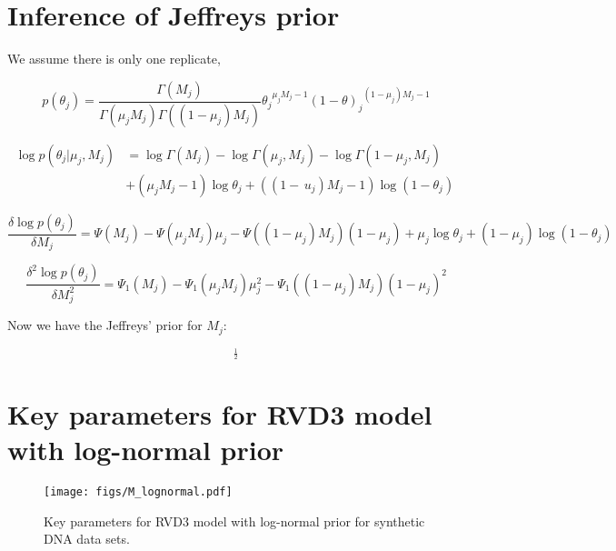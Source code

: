 \documentclass[11pt,reqno]{amsart}
\begin{document}
\section{Inference of Jeffreys prior}\label{sec:appendix_mom}
We assume there is only one replicate,

\begin{equation}\label{eqn:Betapdf}
p\left({\theta }_{j} \right)= \frac{\Gamma \left({M}_{j} \right)}{\Gamma \left({\mu }_{j} {M}_{j}\right)\Gamma \left(( 1-{\mu }_{j}){M}_{j}\right)} {{\theta}_{j}}^{{\mu}_{j}{M}_{j}-1}{\left(1-\theta\right)_{j}}^{\left(1-{\mu}_{j}\right){M}_{j}-1}
\end{equation}

\begin{equation}\label{equ:JefferyInference1}
\begin{split}
\log p\left(\theta_{j}|\mu_{j},M_{j}\right)& =\log \Gamma \left(M_{j}\right)-\log \Gamma\left(\mu_{j},M_{j}\right)- \log \Gamma\left(1-\mu_{j},M_{j}\right)\\
& + (\mu_{j}M_{j}-1)\log\theta_{j} + ((1-\,u_{j})M_{j}-1)\log(1-\theta_{j})\
\end{split}
\end{equation}

\begin{equation}
\frac{\delta\log p(\theta_{j})}{\delta M_{j}} = \Psi(M_{j}) - \Psi(\mu_{j} M_{j})\mu_{j} - \Psi((1-\mu_{j})M_{j})(1-\mu_{j}) +\mu_{j}\log\theta_{j} + (1-\mu_{j})\log(1-\theta_{j})
\end{equation}

\begin{equation}
\frac{\delta^{2}\log p(\theta_{j})}{\delta M_{j}^{2}}  = \Psi_{1}(M_{j}) - \Psi_{1}(\mu_{j} M_{j})\mu_{j}^{2} - \Psi_{1}((1-\mu_{j})M_{j})(1-\mu_{j})^{2}
\end{equation}

Now we have the Jeffreys' prior for $M_{j}$:

\begin{equation}
[-\left(\Psi_{1}(M_{j}) - \Psi_{1}(\mu_{j} M_{j})\mu_{j}^{2} - \Psi_{1}((1-\mu_{j})M_{j}){(1-\mu_{j})^{2}}\right)]^{\frac{1}{2}}
\end{equation}

\section{Key parameters for RVD3 model with log-normal prior}\label{sec:appendix_mom}
\begin{figure}[htbp]
\begin{center}
\texttt{[image: figs/M\_lognormal.pdf]}
\caption{Key parameters for RVD3 model with log-normal prior for synthetic DNA data sets.}
\label{fig:M_lognormal}
\end{center}
\end{figure}



\end{document}
